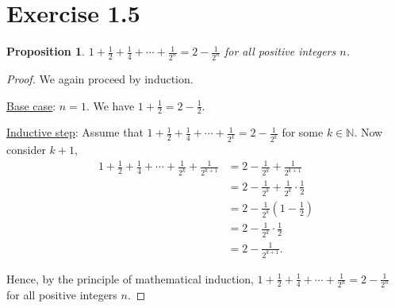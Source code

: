 \documentclass{article}
\newtheorem{proposition}[thm]{Proposition}
\begin{document}
\section*{Exercise 1.5}
\begin{proposition}
    $1 + \frac{1}{2} + \frac{1}{4} + \cdots + \frac{1}{2^n} = 2 - \frac{1}{2^n}$ for all positive 
    integers $n$.
\end{proposition}
\begin{proof}
    We again proceed by induction.

    \underline{Base case}: $n=1$. We have $1 + \frac{1}{2} = 2 - \frac{1}{2}$.

    \underline{Inductive step}: Assume that $1 + \frac{1}{2} + \frac{1}{4} + \cdots 
    + \frac{1}{2^k} = 2 - \frac{1}{2^k}$ for some $k \in \mathbb{N}$. Now consider $k+1$,
    \begin{align*}
        1 + \frac{1}{2} + \frac{1}{4} + \cdots + \frac{1}{2^k} + \frac{1}{2^{k+1}} & = 
        2 - \frac{1}{2^k} + \frac{1}{2^{k+1}} \\
        & = 2 - \frac{1}{2^k} + \frac{1}{2^k}\cdot \frac{1}{2} \\
        & = 2 - \frac{1}{2^k}\left(1 - \frac{1}{2}\right) \\
        & = 2 - \frac{1}{2^k}\cdot \frac{1}{2} \\
        & = 2 - \frac{1}{2^{k+1}}.
    \end{align*}

    Hence, by the principle of mathematical induction, $1 + \frac{1}{2} + \frac{1}{4} + \cdots
    + \frac{1}{2^n} = 2 - \frac{1}{2^n}$ for all positive integers $n$.
\end{proof}
\bigbreak
\end{document}
